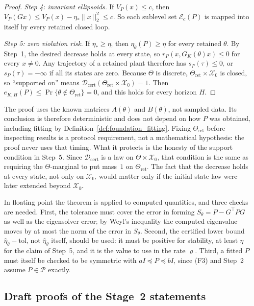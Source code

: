 \begin{proof}
\emph{Step 4: invariant ellipsoids.} If $V_P(x)\le c$, then
$V_P(Gx)\le V_P(x)-\eta_*\|x\|_2^2\le c$. So each sublevel set
$\mathcal E_c(P)$ is mapped into itself by every retained closed loop.

\emph{Step 5: zero violation risk.} If $\eta_*\ge\eta$, then
$\eta_\theta(P)\ge\eta$ for every retained $\theta$. By Step~1, the desired
decrease holds at every state, so $r_P(x,G_K(\theta)x)\le0$ for every
$x\ne0$. Any trajectory of a retained plant therefore has $s_P(\tau)\le0$,
or $s_P(\tau)=-\infty$ if all its states are zero. Because $\Theta$ is
discrete, $\Theta_{\mathrm{ret}}\times\mathcal X_0$ is closed, so
``supported on'' means
$\mathcal D_{\mathrm{cert}}(\Theta_{\mathrm{ret}}\times\mathcal X_0)=1$. Then
$e_{K,H}(P)\le\Pr\{\theta\notin\Theta_{\mathrm{ret}}\}=0$, and this holds for
every horizon $H$.
\end{proof}

The proof uses the known matrices $A(\theta)$ and $B(\theta)$, not
sampled data. Its conclusion is therefore deterministic and does not
depend on how $P$ was obtained, including fitting by
Definition~\ref{def:foundation_fitting}. Fixing $\Theta_{\mathrm{ret}}$
before inspecting results is a protocol requirement, not a mathematical
hypothesis: the proof never uses that timing. What it protects is the
honesty of the support condition in Step~5. Since
$\mathcal D_{\mathrm{cert}}$ is a law on $\Theta\times\mathcal X_0$, that
condition is the same as requiring the $\Theta$-marginal to put mass~$1$
on $\Theta_{\mathrm{ret}}$. The fact that the decrease holds at every
state, not only on $\mathcal X_0$, would matter only if the initial-state
law were later extended beyond $\mathcal X_0$.

In floating point the theorem is applied to computed quantities, and three
checks are needed. First, the tolerance must cover the error in forming
$S_\theta=P-G^\top PG$ as well as the eigensolver error; by Weyl's
inequality the computed eigenvalue moves by at most the norm of the error
in $S_\theta$. Second, the certified lower bound $\widehat\eta_\theta-
\mathrm{tol}$, not $\widehat\eta_\theta$ itself, should be used: it must
be positive for stability, at least $\eta$ for the claim of Step~5, and it
is the value to use in the rate $\varrho$. Third, a fitted $P$ must itself
be checked to be symmetric with $aI\preceq P\preceq bI$, since (F3) and
Step~2 assume $P\in\mathcal P$ exactly.

\subsection{Draft proofs of the Stage~2 statements}
\label{subsec:stage2_proofs}

